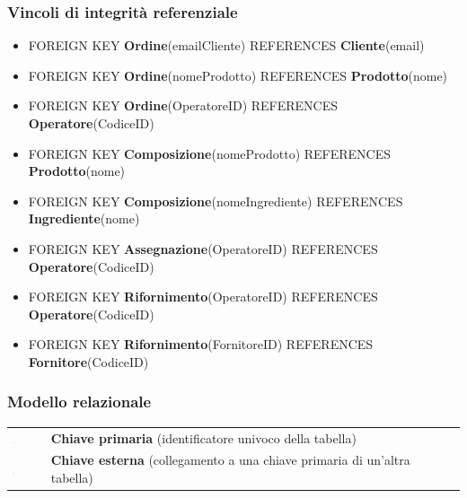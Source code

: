 \documentclass[12pt,a4paper]{article}
\begin{document}
    \subsubsection{Vincoli di integrità referenziale}
    \begin{itemize}[leftmargin=1em]
        \item FOREIGN KEY \textbf{Ordine}(emailCliente) REFERENCES \textbf{Cliente}(email)
        \item FOREIGN KEY \textbf{Ordine}(nomeProdotto) REFERENCES \textbf{Prodotto}(nome)
        \item FOREIGN KEY \textbf{Ordine}(OperatoreID) REFERENCES \textbf{Operatore}(CodiceID)
        \item FOREIGN KEY \textbf{Composizione}(nomeProdotto) REFERENCES \textbf{Prodotto}(nome)
        \item FOREIGN KEY \textbf{Composizione}(nomeIngrediente) REFERENCES \textbf{Ingrediente}(nome)
        \item FOREIGN KEY \textbf{Assegnazione}(OperatoreID) REFERENCES \textbf{Operatore}(CodiceID)
        \item FOREIGN KEY \textbf{Rifornimento}(OperatoreID) REFERENCES \textbf{Operatore}(CodiceID)
        \item FOREIGN KEY \textbf{Rifornimento}(FornitoreID) REFERENCES \textbf{Fornitore}(CodiceID)
    \end{itemize}

    \subsubsection{Modello relazionale}
    \begin{tcolorbox}[
        colback=gray!8,  
        colframe=darkgray, 
        title=Legenda del modello relazionale
    ]
        \begin{tabular}{@{} >{\centering\arraybackslash}m{0.5cm} p{14cm} @{}}
            \includegraphics[width=0.025\textwidth]{figures/g132.pdf} & \textbf{Chiave primaria} (identificatore univoco della tabella) \\
            \addlinespace[0.5em]
            \includegraphics[width=0.025\textwidth]{figures/path621.pdf} & \textbf{Chiave esterna} (collegamento a una chiave primaria di un'altra tabella) \\ 
        \end{tabular}
    \end{tcolorbox}  
     
\end{document}
